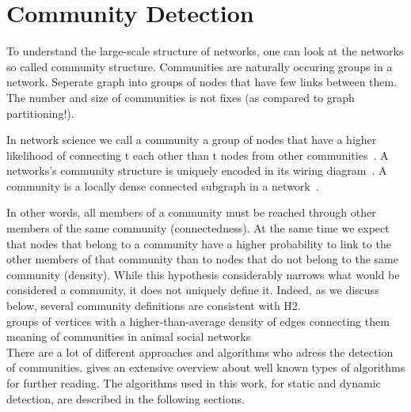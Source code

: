 \section{Community Detection}
To understand the large-scale structure of networks, one can look at the networks so called community structure. Communities are naturally occuring groups in a network. Seperate graph into groups of nodes that have few links between them. The number and size of communities is not fixes (as compared to graph partitioning!).~\cite[p.~371]{newman2010networks}

In network science we call a community a group of nodes that have a higher likelihood of connecting t each other than t nodes from other communities~\cite[p.~X]{barabasi2016network}.
A networks's community structure is uniquely encoded in its wiring diagram~\cite[p.~X]{barabasi2016network}.
A community is a locally dense connected subgraph in a network~\cite[p.~X]{barabasi2016network}.

In other words, all members of a community must be reached through other members of the same community (connectedness). At the same time we expect that nodes that belong to a community have a higher probability to link to the other members of that community than to nodes that do not belong to the same community (density). While this hypothesis considerably narrows what would be considered a community, it does not uniquely define it. Indeed, as we discuss below, several community definitions are consistent with H2.\\
groups of vertices with a higher-than-average density of edges connecting them\\
meaning of communities in animal social networks\\

There are a lot of different approaches and algorithms who adress the detection of communities. \textcite{fortunato2010community} gives an extensive overview about well known  types of algorithms for further reading. The algorithms used in this work, for static and dynamic detection, are described in the following sections.

